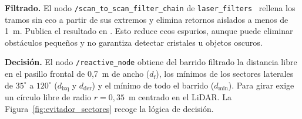 \textbf{Filtrado.} El nodo \texttt{/scan\_to\_scan\_filter\_chain} de
\texttt{laser\_filters}~\cite{laser_filters} rellena los tramos sin eco a partir
de sus extremos y elimina retornos aislados a menos de 1~m. Publica el resultado
en . Esto reduce ecos espurios, aunque puede eliminar
obstáculos pequeños y no garantiza detectar cristales u objetos oscuros.

\textbf{Decisión.} El nodo \texttt{/reactive\_node} obtiene del barrido filtrado
la distancia libre en el pasillo frontal de 0,7~m de ancho ($d_\mathrm{f}$), los
mínimos de los sectores laterales de $35^\circ$ a $120^\circ$
($d_\mathrm{izq}$ y $d_\mathrm{der}$) y el mínimo de todo el barrido ($d_\mathrm{min}$).
Para girar exige un círculo libre de radio $r=0{,}35$~m centrado en el LiDAR.
La Figura~\ref{fig:evitador_sectores} recoge la lógica de decisión.

